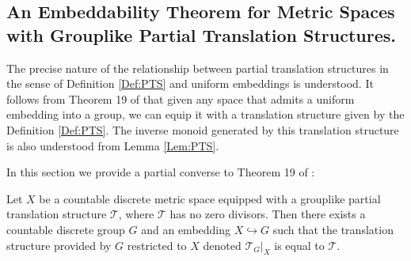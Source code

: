 \begin{corollary}
\subsection{An Embeddability Theorem for Metric Spaces with Grouplike Partial Translation Structures.}

The precise nature of the relationship between partial translation structures in the sense of Definition \ref{Def:PTS} and uniform embeddings is understood. It follows from Theorem 19 of \cite{MR2363428} that given any space that admits a uniform embedding into a group, we can equip it with a translation structure given by the Definition \ref{Def:PTS}. The inverse monoid generated by this translation structure is also understood from Lemma \ref{Lem:PTS}.

In this section we provide a partial converse to Theorem 19 of \cite{MR2363428}:

\begin{theorem}\label{thm:T2}
Let $X$ be a countable discrete metric space equipped with a grouplike partial translation structure $\mathcal{T}$, where $\mathcal{T}$ has no zero divisors. Then there exists a countable discrete group $G$ and an embedding $X \hookrightarrow G$ such that the translation structure provided by $G$ restricted to $X$ denoted $\mathcal{T}_{G}|_{X}$ is equal to $\mathcal{T}$.
\end{theorem}


\end{corollary}
